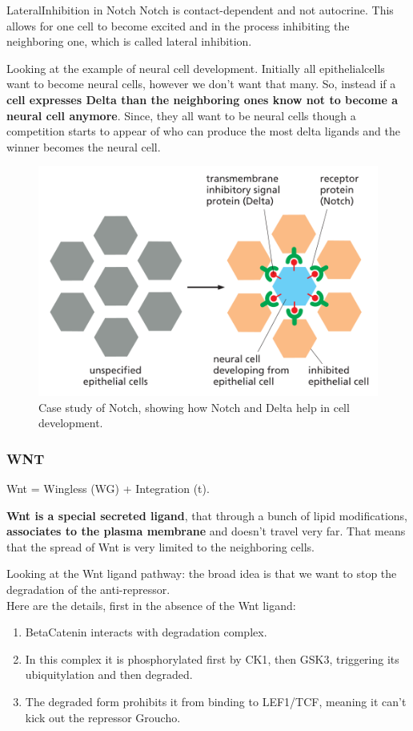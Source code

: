 \documentclass[../main.tex]{subfiles}
\begin{document}
\begin{DefWithTitle}{\gls{LateralInhibition} in Notch}
	 Notch is contact-dependent and not autocrine. This allows for one cell to become excited and in the process inhibiting the neighboring one, which is called lateral inhibition. 
\end{DefWithTitle}

Looking at the example of neural cell development. Initially all \gls{epithelialcells} want to become neural cells, however we don't want that many. So, instead if a \textbf{cell expresses \gls{Delta} than the neighboring ones know not to become a neural cell anymore}. Since, they all want to be neural cells though a competition starts to appear of who can produce the most delta ligands and the winner becomes the neural cell.

\begin{figure}[H]
	\centering
	\includegraphics[width=0.4\linewidth]{Notch_neural}
	\caption{Case study of Notch, showing how Notch and Delta help in cell development.}
\end{figure}



\subsubsection{WNT}
\gls{Wnt} = Wingless (WG) + Integration (t).

\textbf{Wnt is a special secreted ligand}, that through a bunch of lipid modifications, \textbf{associates to the plasma membrane} and doesn't travel very far. That means that the spread of Wnt is very limited to the neighboring cells.

Looking at the Wnt ligand pathway: the broad idea is that we want to stop the degradation of the anti-repressor. \\

Here are the details, first in the absence of the Wnt ligand:
\begin{enumerate}
	\item \gls{BetaCatenin} interacts with degradation complex.
	\item In this complex it is phosphorylated first by \gls{CK1}, then \gls{GSK3}, triggering its ubiquitylation and then degraded.
	\item The degraded form prohibits it from binding to  \gls{LEF1}/TCF, meaning it can't kick out the repressor \gls{Groucho}.
\end{enumerate}
\end{document}
